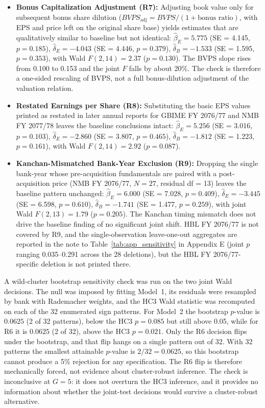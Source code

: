 \begin{itemize}
    \item \textbf{Bonus Capitalization Adjustment (R7):} Adjusting book value only for subsequent bonus share dilution ($\mathit{BVPS}_{\text{adj}} = \mathit{BVPS} / (1 + \text{bonus ratio})$, with EPS and price left on the original share base) yields estimates that are qualitatively similar to baseline but not identical: $\hat{\beta}_E = 5.775$ (SE = 4.145, $p = 0.185$), $\hat{\delta}_E = -4.043$ (SE = 4.446, $p = 0.379$), $\hat{\delta}_B = -1.533$ (SE = 1.595, $p = 0.353$), with Wald $F(2, 14) = 2.37$ ($p = 0.130$). The BVPS slope rises from 0.100 to 0.153 and the joint $F$ falls by about 20\%. The check is therefore a one-sided rescaling of BVPS, not a full bonus-dilution adjustment of the valuation relation.
    \item \textbf{Restated Earnings per Share (R8):} Substituting the basic EPS values printed as restated in later annual reports for GBIME FY 2076/77 and NMB FY 2077/78 leaves the baseline conclusions intact: $\hat{\beta}_E = 5.256$ (SE = 3.016, $p = 0.103$), $\hat{\delta}_E = -2.860$ (SE = 3.807, $p = 0.465$), $\hat{\delta}_B = -1.812$ (SE = 1.223, $p = 0.161$), with Wald $F(2, 14) = 2.92$ ($p = 0.087$).
    \item \textbf{Kanchan-Mismatched Bank-Year Exclusion (R9):} Dropping the single bank-year whose pre-acquisition fundamentals are paired with a post-acquisition price (NMB FY 2076/77, $N = 27$, residual df = 13) leaves the baseline pattern unchanged: $\hat{\beta}_E = 6.000$ (SE = 7.028, $p = 0.409$), $\hat{\delta}_E = -3.445$ (SE = 6.598, $p = 0.610$), $\hat{\delta}_B = -1.741$ (SE = 1.477, $p = 0.259$), with joint Wald $F(2, 13) = 1.79$ ($p = 0.205$). The Kanchan timing mismatch does not drive the baseline finding of no significant joint shift. HBL FY 2076/77 is not covered by R9, and the single-observation leave-one-out aggregates are reported in the note to Table~\ref{tab:app_sensitivity} in Appendix E (joint $p$ ranging 0.035--0.291 across the 28 deletions), but the HBL FY 2076/77-specific deletion is not printed there.
\end{itemize}

A wild-cluster bootstrap sensitivity check was run on the two joint Wald decisions. The null was imposed by fitting Model~1, its residuals were resampled by bank with Rademacher weights, and the HC3 Wald statistic was recomputed on each of the 32 enumerated sign patterns. For Model~2 the bootstrap $p$-value is $0.0625$ (2 of 32 patterns), below the HC3 $p = 0.085$ but still above 0.05, while for R6 it is $0.0625$ (2 of 32), above the HC3 $p = 0.021$. Only the R6 decision flips under the bootstrap, and that flip hangs on a single pattern out of 32. With 32 patterns the smallest attainable $p$-value is $2/32 = 0.0625$, so this bootstrap cannot produce a 5\% rejection for any specification. The R6 flip is therefore mechanically forced, not evidence about cluster-robust inference. The check is inconclusive at $G = 5$: it does not overturn the HC3 inference, and it provides no information about whether the joint-test decisions would survive a cluster-robust alternative.

